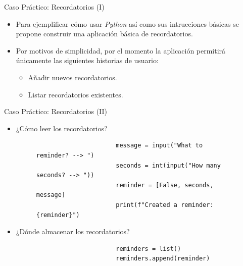 \documentclass{beamer}
\begin{document}
    \begin{frame}{Caso Práctico: Recordatorios (I)}
        \noindent
        \begin{minipage}{.69\textwidth}
          \begin{itemize}
            \item Para ejemplificar cómo usar \emph{Python} así como sus intrucciones básicas se propone construir una aplicación básica de recordatorios.
            \item Por motivos de simplicidad, por el momento la aplicación permitirá únicamente las siguientes historias de usuario:
              \begin{itemize}
                \item Añadir nuevos recordatorios.
                \item Listar recordatorios existentes.
              \end{itemize}
          \end{itemize}
        \end{minipage}
        \begin{minipage}{.29\textwidth}
            \begin{center}
              \fontsize{40}{50}
            \end{center}
        \end{minipage}
    \end{frame}

    \begin{frame}[fragile]{Caso Práctico: Recordatorios (II)}
        \begin{itemize}
          \item ¿Cómo leer los recordatorios?
            \begin{figure}
              \begin{minipage}[c]{0.7\textwidth}
                  \begin{verbatim}
                      message = input("What to reminder? --> ")
                      seconds = int(input("How many seconds? --> "))
                      reminder = [False, seconds, message]
                      print(f"Created a reminder: {reminder}")
                  \end{verbatim}
                \end{minipage}
            \end{figure}
          \vfill
          \item ¿Dónde almacenar los recordatorios?
          \begin{figure}
              \begin{minipage}[c]{0.7\textwidth}
                  \begin{verbatim}
                      reminders = list()
                      reminders.append(reminder)
                  \end{verbatim}
              \end{minipage}
          \end{figure}
        \end{itemize}
    \end{frame}
\end{document}
